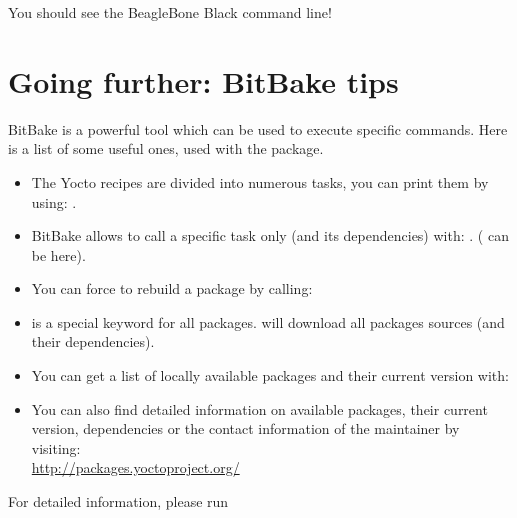 You should see the BeagleBone Black command line!

\section{Going further: BitBake tips}

BitBake is a powerful tool which can be used to execute specific commands. Here
is a list of some useful ones, used with the  package.

\begin{itemize}
  \item The Yocto recipes are divided into numerous tasks, you can print them
        by using: .
  \item BitBake allows to call a specific task only (and its dependencies)
        with: . ( can be
         here).
  \item You can force to rebuild a package by calling: 
  \item {} is a special keyword for all packages.  will download all packages sources (and their
        dependencies).
  \item You can get a list of locally available packages and their current
        version with: \\
  \item You can also find detailed information on available packages, their
        current version, dependencies or the contact information of the
        maintainer by visiting: \\
        \url{http://packages.yoctoproject.org/}
\end{itemize}

For detailed information, please run 
